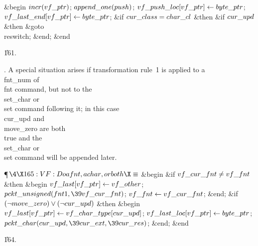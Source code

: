 \&{begin} $\\{incr}(\\{vf\_ptr})$;\5
$\\{append\_one}(\\{push})$;\5
$\\{vf\_push\_loc}[\\{vf\_ptr}]\gets\\{byte\_ptr}$;\5
$\\{vf\_last\_end}[\\{vf\_ptr}]\gets\\{byte\_ptr}$;\6
\&{if} $\\{cur\_class}=\\{char\_cl}$ \1\&{then}\6
\&{if} $\\{cur\_upd}$ \1\&{then}\5
\&{goto} \\{reswitch};\2\2\6
\&{end};\2\6
\&{end}\par
\U161.\fi

. A special situation arises if transformation rule~1 is applied to a
\\{fnt\_num} of \\{fnt} command, but not to the \\{set\_char} or \\{set}
command
following it; in this case \\{cur\_upd} and \\{move\_zero} are both \\{true}
and
the \\{set\_char} or \\{set} command will be appended later.

\Y\P$\4\X165:VF: Do a \\{fnt}, a \\{char}, or both\X\S$\6
\&{begin} \&{if} $\\{vf\_cur\_fnt}\ne\\{vf\_fnt}$ \1\&{then}\6
\&{begin} $\\{vf\_last}[\\{vf\_ptr}]\gets\\{vf\_other}$;\5
$\\{pckt\_unsigned}(\\{fnt1},\39\\{vf\_cur\_fnt})$;\5
$\\{vf\_fnt}\gets\\{vf\_cur\_fnt}$;\6
\&{end};\2\6
\&{if} $(\lnot\\{move\_zero})\lor(\lnot\\{cur\_upd})$ \1\&{then}\6
\&{begin} $\\{vf\_last}[\\{vf\_ptr}]\gets\\{vf\_char\_type}[\\{cur\_upd}]$;\5
$\\{vf\_last\_loc}[\\{vf\_ptr}]\gets\\{byte\_ptr}$;\5
$\\{pckt\_char}(\\{cur\_upd},\39\\{cur\_ext},\39\\{cur\_res})$;\6
\&{end};\2\6
\&{end}\par
\U164.\fi

